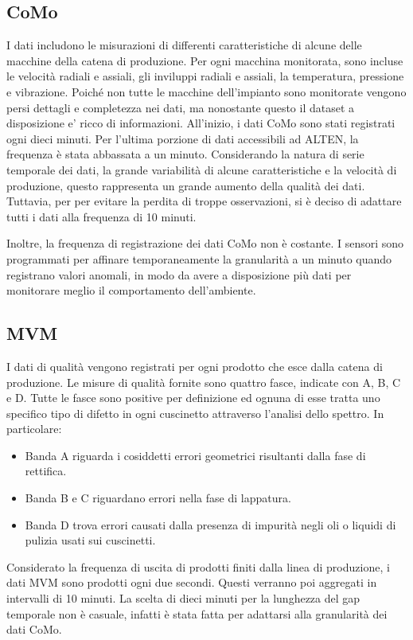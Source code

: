 \subsection{CoMo}
I dati includono le misurazioni di differenti caratteristiche di alcune delle macchine della catena di produzione. Per ogni macchina monitorata, sono incluse le velocità radiali e assiali, gli inviluppi radiali e assiali, la temperatura, pressione e vibrazione.
Poiché non tutte le macchine dell'impianto sono monitorate vengono persi dettagli e completezza nei dati, ma nonostante questo il dataset a disposizione e' ricco di informazioni.
All'inizio, i dati CoMo sono stati registrati ogni dieci minuti.
Per l'ultima porzione di dati accessibili ad ALTEN, la frequenza è stata abbassata a un minuto.
Considerando la natura di serie temporale dei dati, la grande variabilità di alcune caratteristiche e la velocità di produzione, questo rappresenta un grande aumento della qualità dei dati. Tuttavia, per per evitare la perdita di troppe osservazioni, si è deciso di adattare tutti i dati alla frequenza di 10 minuti.


Inoltre, la frequenza di registrazione dei dati CoMo non è costante. I sensori sono programmati per affinare temporaneamente la granularità a
un minuto quando registrano valori anomali, in modo da avere a disposizione più dati per monitorare meglio il comportamento dell'ambiente.
\subsection{MVM}
I dati di qualità vengono registrati per ogni prodotto che esce dalla catena di produzione.
Le misure di qualità fornite sono quattro fasce, indicate con A, B, C e D.
Tutte le fasce sono positive per definizione ed ognuna di esse tratta uno specifico tipo di difetto in ogni cuscinetto attraverso l'analisi dello spettro. In particolare:
\begin{itemize}
  \item Banda A riguarda i cosiddetti errori geometrici risultanti dalla fase di rettifica.
  \item Banda B e C riguardano errori nella fase di lappatura.
  \item Banda D trova errori causati dalla presenza di impurità negli oli o liquidi di pulizia usati sui cuscinetti.
\end{itemize}

Considerato la frequenza di uscita di prodotti finiti dalla linea di produzione, i dati MVM sono prodotti ogni due secondi. Questi verranno poi aggregati in intervalli di 10 minuti. La scelta di dieci minuti per la lunghezza del gap temporale non è casuale, infatti è stata fatta per adattarsi alla granularità dei dati CoMo.

